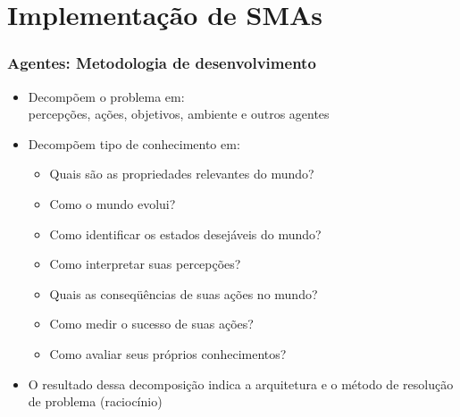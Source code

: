 \section{Implementação de SMAs}
\begin{frame}

    \frametitle{Agentes: Metodologia de desenvolvimento}
    \begin{itemize}
    \pause
      \item Decompõem o problema em: \\
      percepções, ações, objetivos, ambiente e outros agentes
\pause
      \item Decompõem tipo de conhecimento em:
      \begin{itemize}
        \item Quais são as propriedades relevantes do mundo?
        \item Como o mundo evolui?
        \item Como identificar os estados desejáveis do mundo?
        \item Como interpretar suas percepções?
        \item Quais as conseqüências de suas ações no mundo?
        \item Como medir o sucesso de suas ações?
        \item Como avaliar seus próprios conhecimentos?
    
      \end{itemize}
      
      \item O resultado dessa decomposição indica a arquitetura e o método de resolução de problema (raciocínio)
      
    \end{itemize}
\end{frame}


